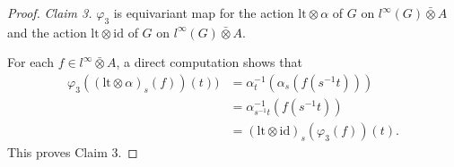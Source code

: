 \documentclass[10pt,a4paper]{amsart}
\begin{document}
\begin{proof}
{\it Claim 3.} $\varphi_3$ is equivariant map for the action $\mathrm{lt}\otimes\alpha$ of $G$ on $l^\infty(G)\bar{\otimes}A$ and the action $\mathrm{lt}\otimes\mathrm{id}$ of $G$ on $l^\infty(G)\bar{\otimes}A$.

For each $f\in l^\infty\bar{\otimes}A$,
a direct computation shows that $$\begin{aligned} \varphi_{3}((\mathrm{lt}\otimes \alpha)_{s}(f))(t))&=
\alpha^{-1}_{t}(\alpha_{s}(f(s^{-1}t)))\\
&=\alpha^{-1}_{s^{-1}t}(f(s^{-1}t))\\
&=(\mathrm{lt}\otimes \mathrm{id})_{s}(\varphi_{3}(f))(t). \end{aligned}$$
This proves Claim 3.
\end{proof}
\end{document}
